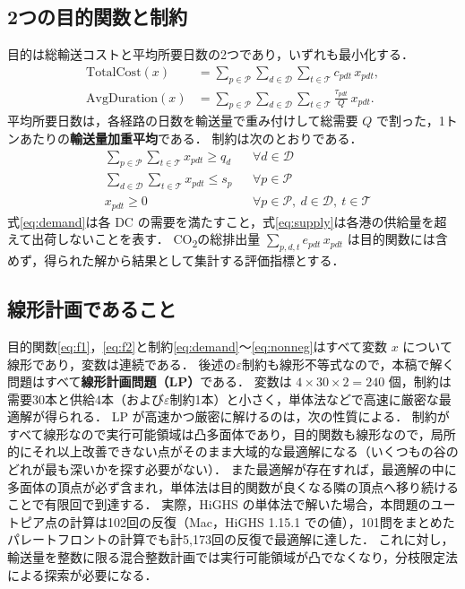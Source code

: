 \documentclass[a4paper,11pt]{ltjsarticle}
\newcommand{\Pset}{\mathcal{P}}
\newcommand{\Dset}{\mathcal{D}}
\newcommand{\Tset}{\mathcal{T}}
\newcommand{\cost}{\mathrm{TotalCost}}
\newcommand{\dur}{\mathrm{AvgDuration}}
\newcommand{\COO}{CO\textsubscript{2}}
\begin{document}
\subsection{2つの目的関数と制約}
目的は総輸送コストと平均所要日数の2つであり，いずれも最小化する．
\begin{align}
\cost(x) &= \sum_{p\in\Pset}\sum_{d\in\Dset}\sum_{t\in\Tset} c_{pdt}\,x_{pdt}, \label{eq:f1}\\
\dur(x) &= \sum_{p\in\Pset}\sum_{d\in\Dset}\sum_{t\in\Tset} \frac{\tau_{pdt}}{Q}\,x_{pdt}. \label{eq:f2}
\end{align}
平均所要日数は，各経路の日数を輸送量で重み付けして総需要 $Q$ で割った，1トンあたりの\textbf{輸送量加重平均}である．
制約は次のとおりである．
\begin{align}
& \textstyle\sum_{p\in\Pset}\sum_{t\in\Tset} x_{pdt} \ge q_d && \forall d\in\Dset \label{eq:demand}\\
& \textstyle\sum_{d\in\Dset}\sum_{t\in\Tset} x_{pdt} \le s_p && \forall p\in\Pset \label{eq:supply}\\
& x_{pdt} \ge 0 && \forall p\in\Pset,\ d\in\Dset,\ t\in\Tset \label{eq:nonneg}
\end{align}
式\eqref{eq:demand}は各 DC の需要を満たすこと，式\eqref{eq:supply}は各港の供給量を超えて出荷しないことを表す．
\COO{}の総排出量 $\sum_{p,d,t} e_{pdt}\,x_{pdt}$ は目的関数には含めず，得られた解から結果として集計する評価指標とする．

\subsection{線形計画であること}
目的関数\eqref{eq:f1}，\eqref{eq:f2}と制約\eqref{eq:demand}〜\eqref{eq:nonneg}はすべて変数 $x$ について線形であり，変数は連続である．
後述の$\varepsilon$制約も線形不等式なので，本稿で解く問題はすべて\textbf{線形計画問題（LP）}である．
変数は $4\times30\times2=240$ 個，制約は需要30本と供給4本（および$\varepsilon$制約1本）と小さく，単体法などで高速に厳密な最適解が得られる．
LP が高速かつ厳密に解けるのは，次の性質による．
制約がすべて線形なので実行可能領域は凸多面体であり，目的関数も線形なので，局所的にそれ以上改善できない点がそのまま大域的な最適解になる（いくつもの谷のどれが最も深いかを探す必要がない）．
また最適解が存在すれば，最適解の中に多面体の頂点が必ず含まれ，単体法は目的関数が良くなる隣の頂点へ移り続けることで有限回で到達する．
実際，HiGHS の単体法で解いた場合，本問題のユートピア点の計算は102回の反復（Mac，HiGHS 1.15.1 での値），101問をまとめたパレートフロントの計算でも計5,173回の反復で最適解に達した．
これに対し，輸送量を整数に限る混合整数計画では実行可能領域が凸でなくなり，分枝限定法による探索が必要になる．
\end{document}
